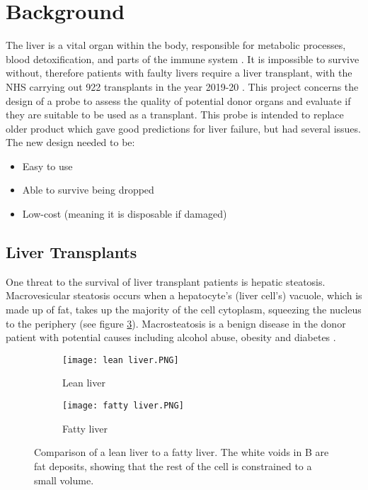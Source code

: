 \section{Background}

The liver is a vital organ within the body, responsible for metabolic processes, blood detoxification, and parts of the immune system \cite{liver_background}. It is impossible to survive without, therefore patients with faulty livers require a liver transplant, with the NHS carrying out 922 transplants in the year 2019-20 \cite{nhs_transplants}. This project concerns the design of a probe to assess the quality of potential donor organs and evaluate if they are suitable to be used as a transplant. This probe is intended to replace older product which gave good predictions for liver failure, but had several issues. The new design needed to be:

\begin{itemize}[noitemsep, nolistsep]
\item Easy to use
\item Able to survive being dropped
\item Low-cost (meaning it is disposable if damaged)
\end{itemize}


\subsection{Liver Transplants}
One threat to the survival of liver transplant patients is hepatic steatosis. Macrovesicular steatosis occurs when a hepatocyte’s (liver cell’s) vacuole, which is made up of fat, takes up the majority of the cell cytoplasm, squeezing the nucleus to the periphery \cite{Imber2002} (see figure \ref{fig: livers}). Macrosteatosis is a benign disease in the donor patient \cite{Imber2002} with potential causes including alcohol abuse, obesity and diabetes \cite{Imber2002}.\\

\begin{figure}[htbp]
	\centering
	\begin{subfigure}[b]{0.4\linewidth}
		\texttt{[image: lean liver.PNG]}
		\caption{Lean liver \cite{Bruno2008}}
		\label{}
	\end{subfigure}
	\begin{subfigure}[b]{0.4\linewidth}
		\texttt{[image: fatty liver.PNG]}
		\caption{Fatty liver \cite{Bruno2008}}
		\label{fig: fatty liver}
	\end{subfigure}
	\caption{Comparison of a lean liver to a fatty liver. The white voids in B are fat deposits, showing that the rest of the cell is constrained to a small volume.}
	\label{fig: livers}
\end{figure}	



